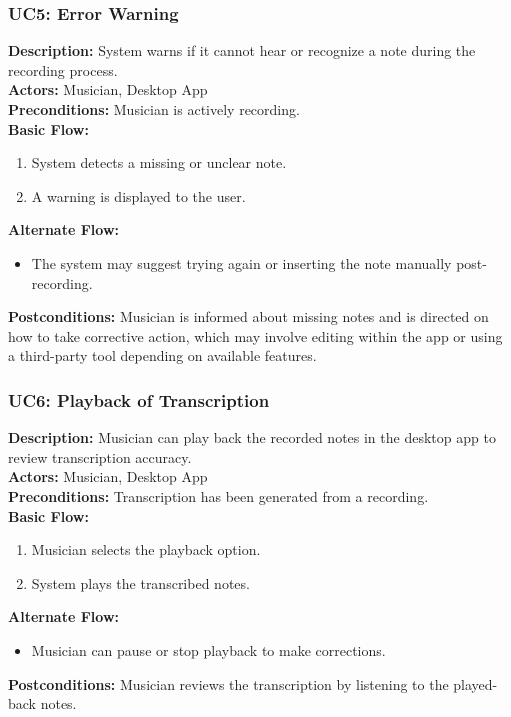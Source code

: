 \documentclass[12pt]{article}
\begin{document}
\subsubsection*{UC5: Error Warning}
\textbf{Description:} System warns if it cannot hear or recognize a note during the recording process. \\
\textbf{Actors:} Musician, Desktop App \\
\textbf{Preconditions:} Musician is actively recording. \\
\textbf{Basic Flow:}
\begin{enumerate}
    \item System detects a missing or unclear note.
    \item A warning is displayed to the user.
\end{enumerate}
\textbf{Alternate Flow:}
\begin{itemize}
    \item The system may suggest trying again or inserting the note manually post-recording.
\end{itemize}
\textbf{Postconditions:} Musician is informed about missing notes and is directed on how to take corrective action, which may involve editing within the app or using a third-party tool depending on available features.

\subsubsection*{UC6: Playback of Transcription}
\textbf{Description:} Musician can play back the recorded notes in the desktop app to review transcription accuracy. \\
\textbf{Actors:} Musician, Desktop App \\
\textbf{Preconditions:} Transcription has been generated from a recording. \\
\textbf{Basic Flow:}
\begin{enumerate}
    \item Musician selects the playback option.
    \item System plays the transcribed notes.
\end{enumerate}
\textbf{Alternate Flow:}
\begin{itemize}
    \item Musician can pause or stop playback to make corrections.
\end{itemize}
\textbf{Postconditions:} Musician reviews the transcription by listening to the played-back notes.
\end{document}

